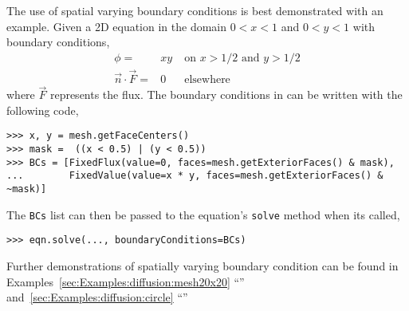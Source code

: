     The use of spatial varying boundary conditions is best demonstrated with an
    example. Given a 2D equation in the domain $0 < x < 1$ and $0 < y < 1$ with
    boundary conditions,
    \begin{eqnarray}
      \phi =& xy \; & \text{on $x>1/2$ and $y>1/2$} \\
      \vec{n} \cdot \vec{F} =& 0 \;& \text{elsewhere}
    \end{eqnarray}
    where $\vec{F}$ represents the flux. The boundary conditions in \FiPy{} can
    be written with the following code,
\begin{verbatim}
>>> x, y = mesh.getFaceCenters()
>>> mask =  ((x < 0.5) | (y < 0.5))
>>> BCs = [FixedFlux(value=0, faces=mesh.getExteriorFaces() & mask),
...        FixedValue(value=x * y, faces=mesh.getExteriorFaces() & ~mask)]
\end{verbatim}
    The \verb+BCs+ list can then be passed to the equation's \verb+solve+ method
    when its called,
\begin{verbatim}
>>> eqn.solve(..., boundaryConditions=BCs)
\end{verbatim}
    Further demonstrations of spatially varying boundary condition can be found
    in Examples~\ref{sec:Examples:diffusion:mesh20x20}
    ``''
    and~\ref{sec:Examples:diffusion:circle}
    ``''








